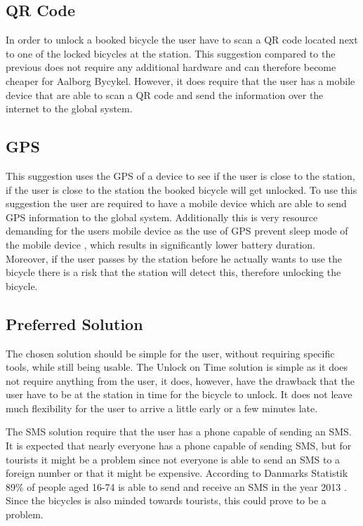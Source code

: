 \subsection{QR Code}
In order to unlock a booked bicycle the user have to scan a QR code located next to one of the locked bicycles at the station.
This suggestion compared to the previous does not require any additional hardware and can therefore become cheaper for Aalborg Bycykel.
However, it does require that the user has a mobile device that are able to scan a QR code and send the information over the internet to the global system.

\subsection{GPS}
This suggestion uses the GPS of a device to see if the user is close to the station, if the user is close to the station the booked bicycle will get unlocked.
To use this suggestion the user are required to have a mobile device which are able to send GPS information to the global system.
Additionally this is very resource demanding for the users mobile device as the use of GPS prevent sleep mode of the mobile device \citep{misc:gpsbatteryusage}, which results in significantly lower battery duration.
Moreover, if the user passes by the station before he actually wants to use the bicycle there is a risk that the station will detect this, therefore unlocking the bicycle.

\subsection{Preferred Solution}
The chosen solution should be simple for the user, without requiring specific tools, while still being usable.
The Unlock on Time solution is simple as it does not require anything from the user, it does, however, have the drawback that the user have to be at the station in time for the bicycle to unlock.
It does not leave much flexibility for the user to arrive a little early or a few minutes late.

The SMS solution require that the user has a phone capable of sending an SMS. 
It is expected that nearly everyone has a phone capable of sending SMS, but for tourists it might be a problem since not everyone is able to send an SMS to a foreign number or that it might be expensive.
According to Danmarks Statistik 89\% of people aged 16-74 is able to send and receive an SMS in the year 2013 \citep{misc:dstMobilephone}.
Since the bicycles is also minded towards tourists, this could prove to be a problem.


